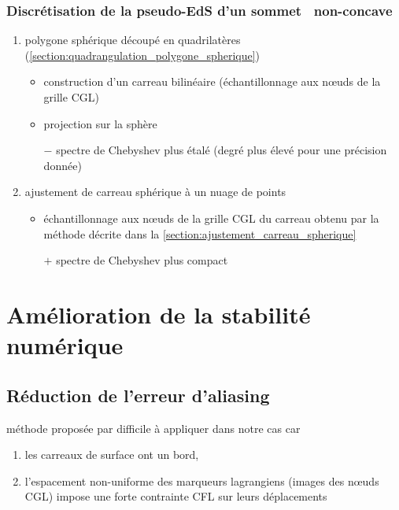 \subsubsection{Discrétisation de la pseudo-EdS d'un sommet \brep\ non-concave}
\begin{enumerate}
	\item polygone sphérique découpé en quadrilatères (\cf \autoref{section:quadrangulation_polygone_spherique})
	\begin{itemize}
		\item construction d'un carreau bilinéaire (échantillonnage aux n\oe uds de la grille CGL)
		\item projection sur la sphère
		\item[$-$] spectre de Chebyshev plus étalé (degré plus élevé pour une précision donnée)
	\end{itemize}
	\item ajustement de carreau sphérique à un nuage de points
	\begin{itemize}
		\item échantillonnage aux n\oe uds de la grille CGL du carreau obtenu par la méthode décrite dans la \autoref{section:ajustement_carreau_spherique}
		\item[$+$] spectre de Chebyshev plus compact
	\end{itemize}
\end{enumerate}




\section{Amélioration de la stabilité numérique}
\label{section:instabilités}

\subsection{Réduction de l'erreur d'aliasing}

méthode proposée par \cite{rahimian2015} difficile à appliquer dans notre cas car 
\begin{enumerate}
	\item les carreaux de surface ont un bord, 
	\item l'espacement non-uniforme des marqueurs lagrangiens (images des n\oe uds CGL) impose une forte contrainte CFL sur leurs déplacements
\end{enumerate}

